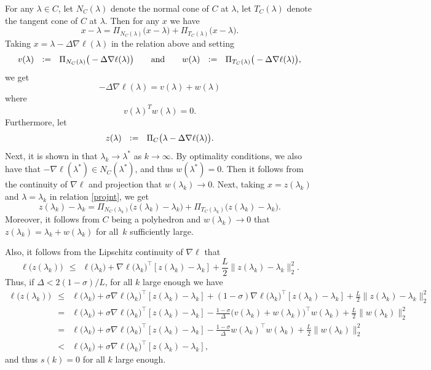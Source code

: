 \documentclass[article]{jss}
\def\defi{\vcentcolon=}
\begin{document}
{For any $\lambda \in C$, let $N_{C}(\lambda)$ denote the normal cone of $C$ at $\lambda$, let $T_{C}(\lambda)$ denote the tangent cone of $C$ at $\lambda$. 
Then for any $x$ we have
\begin{equation}\label{projnt}
x-\lambda=\Pi_{N_{C}(\lambda)}\big(x-\lambda \big)
+
\Pi_{T_{C}(\lambda)}\big(x-\lambda \big).
\end{equation}
Taking $x=\lambda-\Delta \nabla \ell(\lambda)$ 
in the relation above and setting
\[
v(\lambda) \ \ \defi \ \ \Pi_{N_{C}(\lambda)}\big(-\Delta \nabla \ell(\lambda)\big)
\qquad \mbox{and} \qquad
w(\lambda) \ \ \defi \ \ \Pi_{T_{C}(\lambda)}\big(-\Delta \nabla \ell(\lambda)\big),
\]
we get
$$
-\Delta \nabla \ell(\lambda) 
= v(\lambda) + w(\lambda)
$$
where
$$
v(\lambda)^T w(\lambda)=0.
$$
Furthermore, let
\[
z(\lambda) \ \ \defi \ \ \Pi_{C}\big(\lambda - \Delta \nabla \ell(\lambda)\big).
\]
Next, it is shown in \cite{iusem2003}  that $\lambda_{k} \to \lambda^*$ as $k \to \infty$.
By optimality conditions, we also have
that $-\nabla \ell(\lambda^*) \in N_{C}(\lambda^*)$, and thus $w(\lambda^*) = 0$.
Then it follows from the continuity of $\nabla \ell$ and projection that $w(\lambda_{k}) \to 0$.
Next, taking $x=z(\lambda_k)$ and
$\lambda=\lambda_k$
in relation \eqref{projnt}, we get
$$
z(\lambda_k)-\lambda_k =\Pi_{N_{C}(\lambda_k)}\big(z(\lambda_k)-\lambda_k \big)
+
\Pi_{T_{C}(\lambda_k)}\big(z(\lambda_k)-\lambda_k \big).
$$
Moreover, it follows from $C$ being a polyhedron and $w(\lambda_{k}) \to 0$ that $z(\lambda_{k}) = \lambda_{k} + w(\lambda_{k})$ for all~$k$ sufficiently large.

Also, it follows from the Lipschitz continuity of $\nabla \ell$ that
\[
\ell\big(z(\lambda_{k})\big) \ \ \le \ \ \ell\big(\lambda_{k}\big) + \nabla \ell\big(\lambda_{k}\big)^{\top} [z(\lambda_{k}) - \lambda_{k}] + \frac{L}{2} \|z(\lambda_{k}) - \lambda_{k}\|_{2}^2.
\]
Thus, if $\Delta < 2 (1 - \sigma) / L$, for all $k$ large enough we have
\begin{eqnarray*}
\ell\big(z(\lambda_{k})\big) & \le & \ell\big(\lambda_{k}\big) + \sigma \nabla \ell\big(\lambda_{k}\big)^{\top} [z(\lambda_{k}) - \lambda_{k}] + (1 - \sigma) \nabla \ell\big(\lambda_{k}\big)^{\top} [z(\lambda_{k}) - \lambda_{k}] + \frac{L}{2} \|z(\lambda_{k}) - \lambda_{k}\|_{2}^2 \\
& = & \ell\big(\lambda_{k}\big) + \sigma \nabla \ell\big(\lambda_{k}\big)^{\top} [z(\lambda_{k}) - \lambda_{k}] - \frac{1 - \sigma}{\Delta} \big(v(\lambda_{k}) + w(\lambda_{k})\big)^{\top} w(\lambda_{k}) + \frac{L}{2} \|w(\lambda_{k})\|_{2}^2 \\
& = & \ell\big(\lambda_{k}\big) + \sigma \nabla \ell\big(\lambda_{k}\big)^{\top} [z(\lambda_{k}) - \lambda_{k}] - \frac{1 - \sigma}{\Delta} w(\lambda_{k})^{\top} w(\lambda_{k}) + \frac{L}{2} \|w(\lambda_{k})\|_{2}^2 \\
& < & \ell\big(\lambda_{k}\big) + \sigma \nabla \ell\big(\lambda_{k}\big)^{\top} [z(\lambda_{k}) - \lambda_{k}],
\end{eqnarray*}
and thus $s(k) = 0$ for all $k$ large enough.

}
\end{document}
